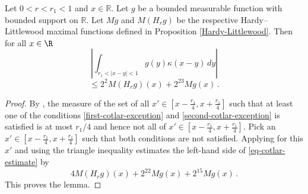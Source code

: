 \begin{lemma}
\label{Cotlar-estimate}
Let $0<r<r_1<1$ and $x\in \mathbb{R}$. Let $g$ be a bounded measurable function with bounded support on $\mathbb{R}$. Let $Mg$ and $M(H_r g)$ be the respective Hardy--Littlewood maximal functions
defined in Proposition
\ref{Hardy-Littlewood}.
Then for all $x\in \R$
\begin{equation}\label{eq-cotlar-estimate}
\left|
\int_{r_1<|x-y|<1}
g(y) \kappa(x-y)\, dy
\right|
\end{equation}
\begin{equation}\le
2^{2}M(H_rg)(x)+ 2^{23} Mg(x)
\, .
\end{equation}
\end{lemma}


\begin{proof}
By , the measure of the set
of all $x'\in
[x-\frac{r_1}4,x+\frac{r_1}4]$
such that at least one of the conditions
\eqref{first-cotlar-exception} and
\eqref{second-cotlar-exception} is satisfied is at most $r_1/4$ and hence not all of
 $x'\in
[x-\frac{r_1}4,x+\frac{r_1}4]$. Pick an
$x'\in
[x-\frac{r_1}4,x+\frac{r_1}4]$ such that both conditions are not satisfied.
Applying 
for this $x'$ and using the triangle inequality
estimates the left-hand side of \eqref{eq-cotlar-estimate}
by
\begin{equation}
    4M(H_rg)(x)+2^{22}Mg(x)+2^{15}Mg(x)\, .
\end{equation}
This proves the lemma.
\end{proof}


